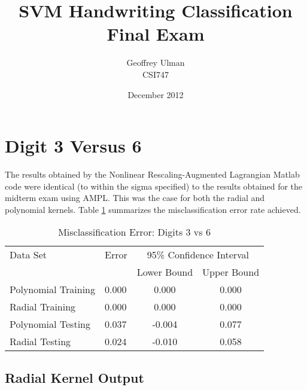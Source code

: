 \documentclass{article}
\begin{document}
\title{SVM Handwriting Classification\\
       Final Exam}
\author{Geoffrey Ulman\\
        CSI747}
\date{December 2012}
\maketitle

\section{Digit 3 Versus 6}\label{digit36}

The results obtained by the Nonlinear Rescaling-Augmented Lagrangian Matlab code were identical (to within the sigma specified) to the results obtained for the midterm exam using AMPL. This was the case for both the radial and polynomial kernels. Table \ref{table1} summarizes the misclassification error rate achieved.

\begin{table}
\caption{Misclassification Error: Digits 3 vs 6}
\begin{center}
\begin{tabular}{llcc}
\toprule
Data Set & Error & \multicolumn{2}{c}{95\% Confidence Interval} \\
\cmidrule(r){3-4}
& & Lower Bound & Upper Bound \\
\midrule
Polynomial Training & 0.000 & 0.000 & 0.000 \\
Radial Training & 0.000 & 0.000 & 0.000 \\
Polynomial Testing & 0.037 & -0.004 & 0.077 \\
Radial Testing & 0.024 & -0.010 & 0.058 \\
\bottomrule
\end{tabular}
\end{center}
\label{table1}
\end{table}

\subsection{Radial Kernel Output}\label{radial36}
\end{document}
